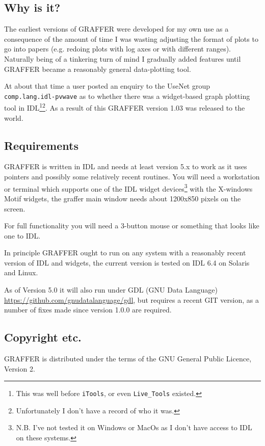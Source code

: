\documentclass[11pt,twoside,english]{article}
\begin{document}
\subsection{Why is it?}

The earliest versions of GRAFFER were developed for my own use as a
consequence of the amount of time I was wasting adjusting the format of
plots to go into papers (e.g. redoing plots with log axes or with
different ranges). Naturally being of a tinkering turn of mind I
gradually added features until GRAFFER became a reasonably general
data-plotting tool.

At about that time a user posted an enquiry to the UseNet group
\texttt{comp.lang.idl-pvwave} as to whether there was a widget-based
graph plotting tool in IDL\footnote{This was well before
  \texttt{iTools}, or even \texttt{Live\_Tools}
  existed.}\footnote{Unfortunately I don't have a record of who it
  was.}. As a result of this GRAFFER version 1.03 was released to the
world.


\subsection{Requirements}

GRAFFER is written in IDL and needs at least version 5.x to work as it
uses pointers and possibly some relatively recent routines. You will
need a workstation or terminal which supports one of the IDL widget
devices\footnote{N.B. I've not tested it on Windows or MacOs as I
  don't have access to IDL on these systems.} with the X-windows Motif
widgets, the graffer main window needs about 1200x850 pixels on the
screen.

For full functionality you will need a 3-button mouse or something that
looks like one to IDL.

In principle GRAFFER ought to run on any system with a reasonably
recent version of IDL and widgets, the current version is tested on IDL
6.4 on Solaris and Linux.

As of Version 5.0 it will also run under GDL (GNU Data Language)
\url{https://github.com/gnudatalanguage/gdl}, but requires a recent GIT
version, as a number of fixes made since version 1.0.0 are required. 

\subsection{Copyright etc.}

GRAFFER is distributed under the terms of the GNU General Public
Licence, Version 2.
\end{document}
